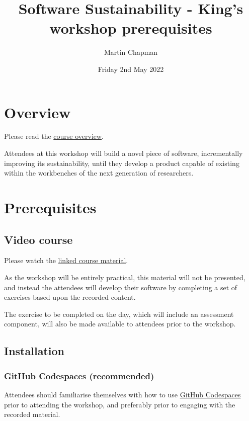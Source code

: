 \documentclass{article}
\title{Software Sustainability - King's workshop prerequisites}
\author{Martin Chapman}
\date{Friday 2nd May 2022}
\begin{document}

\maketitle

\section{Overview}

Please read the \href{https://github.com/martinteaching/sustainability#overview}{course overview}.

Attendees at this workshop will build a novel piece of software, incrementally improving its sustainability, until they develop a product capable of existing within the workbenches of the next generation of researchers.

\section{Prerequisites}

\subsection{Video course}

Please watch the \href{https://github.com/martinteaching/sustainability#material}{linked course material}.

As the workshop will be entirely practical, this material will not be presented, and instead the attendees will develop their software by completing a set of exercises based upon the recorded content. 

The exercise to be completed on the day, which will include an assessment component, will also be made available to attendees prior to the workshop.

\subsection{Installation}

\subsubsection{GitHub Codespaces (recommended)}

Attendees should familiarise themselves with how to use \href{https://github.com/codespaces}{GitHub Codespaces} prior to attending the workshop, and preferably prior to engaging with the recorded material.
\end{document}
